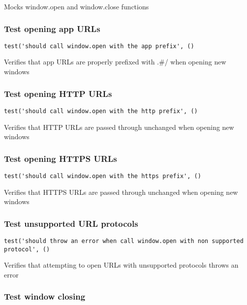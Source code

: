 \documentclass[a4paper]{article}
\begin{document}
Mocks window.open and window.close functions

\hypertarget{toc724}{}
\subsubsection{Test opening app URLs}

\begin{lstlisting}
test('should call window.open with the app prefix', ()
\end{lstlisting}

Verifies that app URLs are properly prefixed with .\#/
when opening new windows

\hypertarget{toc725}{}
\subsubsection{Test opening HTTP URLs}

\begin{lstlisting}
test('should call window.open with the http prefix', ()
\end{lstlisting}

Verifies that HTTP URLs are passed through unchanged
when opening new windows

\hypertarget{toc726}{}
\subsubsection{Test opening HTTPS URLs}

\begin{lstlisting}
test('should call window.open with the https prefix', ()
\end{lstlisting}

Verifies that HTTPS URLs are passed through unchanged
when opening new windows

\hypertarget{toc727}{}
\subsubsection{Test unsupported URL protocols}

\begin{lstlisting}
test('should throw an error when call window.open with non supported protocol', ()
\end{lstlisting}

Verifies that attempting to open URLs with unsupported protocols
throws an error

\hypertarget{toc728}{}
\subsubsection{Test window closing}
\end{document}
